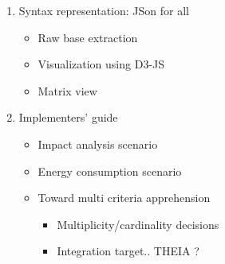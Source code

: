 \begin{enumerate}
    \item Syntax representation: JSon for all
        \begin{itemize}
            \item Raw base extraction
            \item Visualization using D3-JS
            \item Matrix view
        \end{itemize}
    \item Implementers' guide
        \begin{itemize}
            \item Impact analysis scenario
            \item Energy consumption scenario
            \item Toward multi criteria apprehension 
                \begin{itemize}
                    \item Multiplicity/cardinality decisions
                    \item Integration target.. THEIA ?
                \end{itemize}
        \end{itemize}
\end{enumerate}

